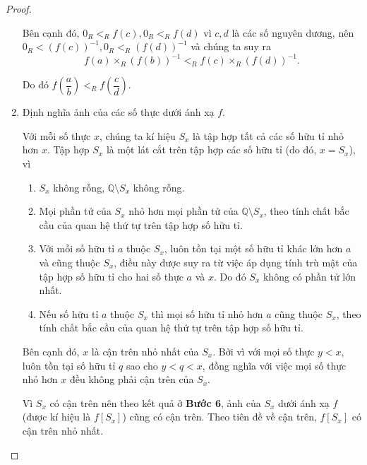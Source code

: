 \begin{proof}
\begin{enumerate}[label={\textbf{Bước \arabic*.}},itemindent=1cm]
              Bên cạnh đó, $0_{R} <_{R} f(c), 0_{R} <_{R} f(d)$ vì $c, d$ là các số nguyên dương, nên $0_{R} < {(f(c))}^{-1}, 0_{R} <_{R} {(f(d))}^{-1}$ và chúng ta suy ra
              \[
                  f(a)\times_{R} {(f(b))}^{-1} <_{R} f(c)\times_{R} {(f(d))}^{-1}.
              \]

              Do đó $f\left(\dfrac{a}{b}\right) <_{R} f\left(\dfrac{c}{d}\right)$.
        \item Định nghĩa ảnh của các số thực dưới ánh xạ $f$.

              Với mỗi số thực $x$, chúng ta kí hiệu $S_{x}$ là tập hợp tất cả các số hữu tỉ nhỏ hơn $x$. Tập hợp $S_{x}$ là một lát cắt trên tập hợp các số hữu tỉ (do đó, $x = S_{x}$), vì
              \begin{enumerate}[label={(DC\arabic*)},itemindent=0.5cm]
                  \item $S_{x}$ không rỗng, $\mathbb{Q}\setminus S_{x}$ không rỗng.
                  \item Mọi phần tử của $S_{x}$ nhỏ hơn mọi phần tử của $\mathbb{Q}\setminus S_{x}$, theo tính chất bắc cầu của quan hệ thứ tự trên tập hợp số hữu tỉ.
                  \item Với mỗi số hữu tỉ $a$ thuộc $S_{x}$, luôn tồn tại một số hữu tỉ khác lớn hơn $a$ và cũng thuộc $S_{x}$, điều này được suy ra từ việc áp dụng tính trù mật của tập hợp số hữu tỉ cho hai số thực $a$ và $x$. Do đó $S_{x}$ không có phần tử lớn nhất.
                  \item Nếu số hữu tỉ $a$ thuộc $S_{x}$ thì mọi số hữu tỉ nhỏ hơn $a$ cũng thuộc $S_{x}$, theo tính chất bắc cầu của quan hệ thứ tự trên tập hợp số hữu tỉ.
              \end{enumerate}

              Bên cạnh đó, $x$ là cận trên nhỏ nhất của $S_{x}$. Bởi vì với mọi số thực $y < x$, luôn tồn tại số hữu tỉ $q$ sao cho $y < q < x$, đồng nghĩa với việc mọi số thực nhỏ hơn $x$ đều không phải cận trên của $S_{x}$.

              Vì $S_{x}$ có cận trên nên theo kết quả ở \textbf{Bước 6}, ảnh của $S_{x}$ dưới ánh xạ $f$ (được kí hiệu là $f[S_{x}]$) cũng có cận trên. Theo tiên đề về cận trên, $f[S_{x}]$ có cận trên nhỏ nhất.


\end{enumerate}
\end{proof}
